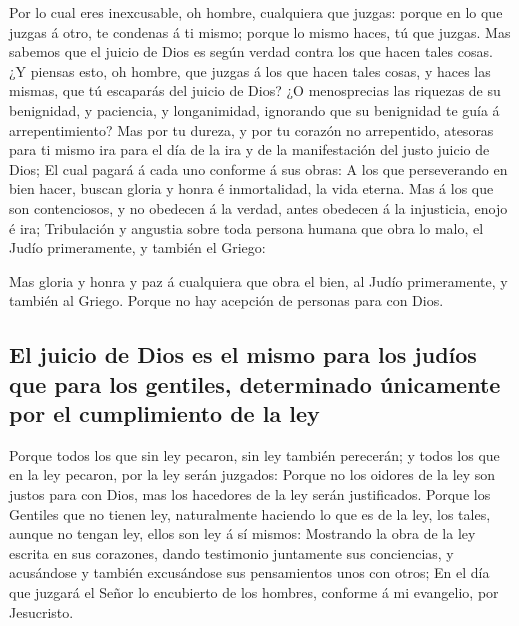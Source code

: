  Por lo cual eres inexcusable, oh hombre, cualquiera que
juzgas: porque en lo que juzgas á otro, te condenas á ti mismo; porque
lo mismo haces, tú que juzgas.  Mas sabemos que el juicio de
Dios es según verdad contra los que hacen tales cosas.  ¿Y
piensas esto, oh hombre, que juzgas á los que hacen tales cosas, y haces
las mismas, que tú escaparás del juicio de Dios?  ¿O
menosprecias las riquezas de su benignidad, y paciencia, y longanimidad,
ignorando que su benignidad te guía á arrepentimiento?  Mas
por tu dureza, y por tu corazón no arrepentido, atesoras para ti mismo
ira para el día de la ira y de la manifestación del justo juicio de
Dios;  El cual pagará á cada uno conforme á sus obras:
 A los que perseverando en bien hacer, buscan gloria y honra
é inmortalidad, la vida eterna.  Mas á los que son
contenciosos, y no obedecen á la verdad, antes obedecen á la injusticia,
enojo é ira;  Tribulación y angustia sobre toda persona
humana que obra lo malo, el Judío primeramente, y también el Griego:

 Mas gloria y honra y paz á cualquiera que obra el bien, al
Judío primeramente, y también al Griego.  Porque no hay
acepción de personas para con Dios.

\hypertarget{el-juicio-de-dios-es-el-mismo-para-los-juduxedos-que-para-los-gentiles-determinado-uxfanicamente-por-el-cumplimiento-de-la-ley}{%
\subsection{El juicio de Dios es el mismo para los judíos que para los
gentiles, determinado únicamente por el cumplimiento de la
ley}\label{el-juicio-de-dios-es-el-mismo-para-los-juduxedos-que-para-los-gentiles-determinado-uxfanicamente-por-el-cumplimiento-de-la-ley}}

 Porque todos los que sin ley pecaron, sin ley también
perecerán; y todos los que en la ley pecaron, por la ley serán juzgados:
 Porque no los oidores de la ley son justos para con Dios,
mas los hacedores de la ley serán justificados.  Porque los
Gentiles que no tienen ley, naturalmente haciendo lo que es de la ley,
los tales, aunque no tengan ley, ellos son ley á sí mismos:
 Mostrando la obra de la ley escrita en sus corazones,
dando testimonio juntamente sus conciencias, y acusándose y también
excusándose sus pensamientos unos con otros;  En el día que
juzgará el Señor lo encubierto de los hombres, conforme á mi evangelio,
por Jesucristo.

